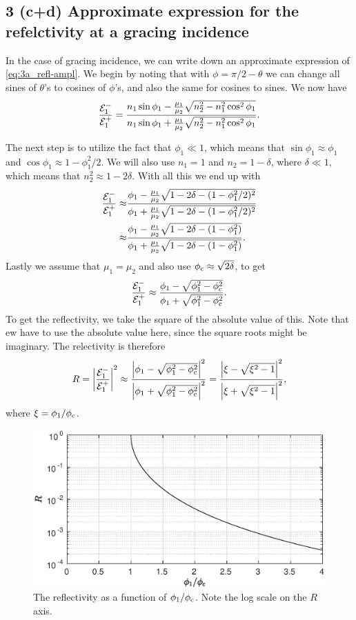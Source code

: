 \documentclass[11pt,letter, swedish, english
]{article}
\begin{document}
\subsection*{3 (c+d)\;
Approximate expression for the refelctivity 
at a gracing incidence}
In the case of gracing incidence, we can write down an approximate
expression of \eqref{eq:3a_refl-ampl}. We begin by noting that with
$\phi=\pi/2-\theta$ we can change all sines of $\theta$'s to cosines
of $\phi$'s, and also the same for cosines to sines. We now have
\begin{equation}
\frac{{\mathcal{E}_1^-}}{{\mathcal{E}_1^+}}=
\frac{n_1\sin\phi_1 - 
\frac{\mu_1}{\mu_2}\sqrt{n_2^2-n_1^2\cos^2\phi_1}}
{n_1\sin\phi_1 + \frac{\mu_1}{\mu_2}\sqrt{n_2^2-n_1^2\cos^2\phi_1}}.
\end{equation}

The next step is to utilize the fact that $\phi_1\ll1$, which means
that $\sin\phi_1 \approx \phi_1$ and 
$\cos\phi_1 \approx 1 - \phi_1^2/2$. 
We will also use $n_1=1$ and $n_2=1-\delta$, where $\delta\ll1$, which
means that $n_2^2 \approx 1 -2\delta$. With all this we end up with
\begin{equation}
\begin{aligned}
\frac{{\mathcal{E}_1^-}}{{\mathcal{E}_1^+}}\approx&
\frac{\phi_1 - \frac{\mu_1}{\mu_2}\sqrt{1-2\delta-(1-\phi_1^2/2)^2}}
{\phi_1 + \frac{\mu_1}{\mu_2}\sqrt{1-2\delta-(1-\phi_1^2/2)^2}}\\
\approx&
\frac{\phi_1 - \frac{\mu_1}{\mu_2}\sqrt{1-2\delta-(1-\phi_1^2)}}
{\phi_1 + \frac{\mu_1}{\mu_2}\sqrt{1-2\delta-(1-\phi_1^2)}}.
\end{aligned}
\end{equation}
Lastly we assume that $\mu_1=\mu_2$ and also use
$\phi_\text{c}\approx\sqrt{2\delta}$, to get
\begin{equation}
\frac{{\mathcal{E}_1^-}}{{\mathcal{E}_1^+}} \approx
\frac{\phi_1 - \sqrt{\phi_1^2 - \phi_\text{c}^2}}
{\phi_1 + \sqrt{\phi_1^2 - \phi_\text{c}^2}}.
\end{equation}
To get the reflectivity, we take the square of the absolute value of
this. Note that ew have to use the absolute value here, since the
square roots might be imaginary. The relectivity is therefore
\begin{equation}
R = \abs{\frac{{\mathcal{E}_1^-}}{{\mathcal{E}_1^+}}}^2 \approx
\frac{\abs{\phi_1 - \sqrt{\phi_1^2 - \phi_\text{c}^2}}^2}
{\abs{\phi_1 + \sqrt{\phi_1^2 - \phi_\text{c}^2}}^2}
=\frac{\abs{\xi - \sqrt{\xi^2 - 1}}^2}
{\abs{\xi + \sqrt{\xi^2 - 1}}^2},
\end{equation}
where $\xi=\phi_1/\phi_\text{c}$.

\begin{figure}
\centering
\includegraphics[width=.7\textwidth]{3d_R.eps}
\caption{The reflectivity as a function of $\phi_1/\phi_\text{c}$. Note the
  log scale on the $R$ axis.}
\label{fig:3d_R}
\end{figure}
\end{document}

